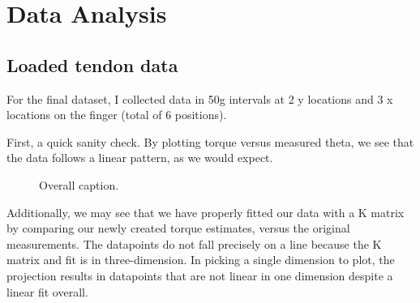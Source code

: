 \documentclass[preprint,12pt,3p]{elsarticle}
\begin{document}
\section{Data Analysis}

\subsection{Loaded tendon data}

For the final dataset, I collected data in 50g intervals at 2 y locations and 3 x locations on the
finger (total of 6 positions). 

First, a quick sanity check. By plotting torque versus measured theta, we see that the data follows
a linear pattern, as we would expect.


\begin{figure}[htbp]
    \centering 
        \hfil %
        \hfil
        \caption{ Overall caption.}
\end{figure}

Additionally, we may see that we have properly fitted our data with a K matrix by comparing our
newly created torque estimates, versus the original measurements. The datapoints do not fall
precisely on a line because the K matrix and fit is in three-dimension. In picking a single
dimension to plot, the projection results in datapoints that are not linear in one dimension despite
a linear fit overall.
\end{document}
